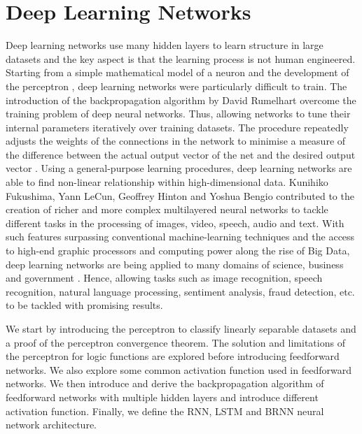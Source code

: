 \chapter{Deep Learning Networks}
Deep learning networks use many hidden layers to learn structure in large datasets and the key aspect is that the learning process is not human engineered. Starting from a simple mathematical model of a neuron \cite{McCulloch:1943aa} and the development of the perceptron \cite{Rosenblatt:1958aa}, deep learning networks were particularly difficult to train. The introduction of the backpropagation algorithm by David Rumelhart overcome the training problem of deep neural networks. Thus, allowing networks to tune their internal parameters iteratively over training datasets. The procedure repeatedly adjusts the weights of the connections in the network to minimise a measure of the difference between the actual output vector of the net and the desired output vector \cite{Rumelhart:1986aa}. Using a general-purpose learning procedures, deep learning networks are able to find non-linear relationship within high-dimensional data. Kunihiko Fukushima, Yann LeCun, Geoffrey Hinton and Yoshua Bengio contributed to the creation of richer and more complex multilayered neural networks to tackle different tasks in the processing of images, video, speech, audio and text. With such features surpassing conventional machine-learning techniques and the access to high-end graphic processors and computing power along the rise of Big Data, deep learning networks are being applied to many domains of science, business and government \cite{LeCun:2015aa}. Hence, allowing tasks such as image recognition, speech recognition, natural language processing, sentiment analysis, fraud detection, etc. to be tackled with promising results.

We start by introducing the perceptron to classify linearly separable datasets and a proof of the perceptron convergence theorem. The solution and limitations of the perceptron for logic functions are explored before introducing feedforward networks. We also explore some common activation function used in feedforward networks. We then introduce and derive the backpropagation algorithm of feedforward networks with multiple hidden layers and introduce different activation function. Finally, we define the RNN, LSTM and BRNN neural network architecture.
